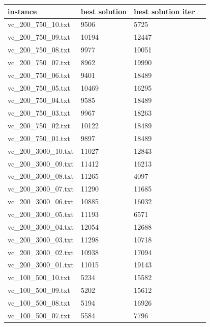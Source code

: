 \documentclass[11pt]{article}
\begin{document}
\pagebreak

\begin{table}[!ht]
    \centering
    \begin{tabular}{|l|l|l|l|}
    \hline
        instance & best solution & best solution iter \\ \hline

        vc\_200\_750\_10.txt & 9506 & 5725 \\ \hline
        vc\_200\_750\_09.txt & 10194 & 12447 \\ \hline
        vc\_200\_750\_08.txt & 9977 & 10051 \\ \hline
        vc\_200\_750\_07.txt & 8962 & 19990 \\ \hline
        vc\_200\_750\_06.txt & 9401 & 18489 \\ \hline
        vc\_200\_750\_05.txt & 10469 & 16295 \\ \hline
        vc\_200\_750\_04.txt & 9585 & 18489 \\ \hline
        vc\_200\_750\_03.txt & 9967 & 18263 \\ \hline
        vc\_200\_750\_02.txt & 10122 & 18489 \\ \hline
        vc\_200\_750\_01.txt & 9897 & 18489 \\ \hline
        vc\_200\_3000\_10.txt & 11027 & 12843 \\ \hline
        vc\_200\_3000\_09.txt & 11412 & 16213 \\ \hline
        vc\_200\_3000\_08.txt & 11265 & 4097 \\ \hline
        vc\_200\_3000\_07.txt & 11290 & 11685 \\ \hline
        vc\_200\_3000\_06.txt & 10885 & 16032 \\ \hline
        vc\_200\_3000\_05.txt & 11193 & 6571 \\ \hline
        vc\_200\_3000\_04.txt & 12054 & 12688 \\ \hline
        vc\_200\_3000\_03.txt & 11298 & 10718 \\ \hline
        vc\_200\_3000\_02.txt & 10938 & 17094 \\ \hline
        vc\_200\_3000\_01.txt & 11015 & 19143 \\ \hline
        vc\_100\_500\_10.txt & 5234 & 15582 \\ \hline
        vc\_100\_500\_09.txt & 5202 & 15612 \\ \hline
        vc\_100\_500\_08.txt & 5194 & 16926 \\ \hline
        vc\_100\_500\_07.txt & 5584 & 7796 \\ \hline

\end{tabular}
\end{table}
\end{document}
